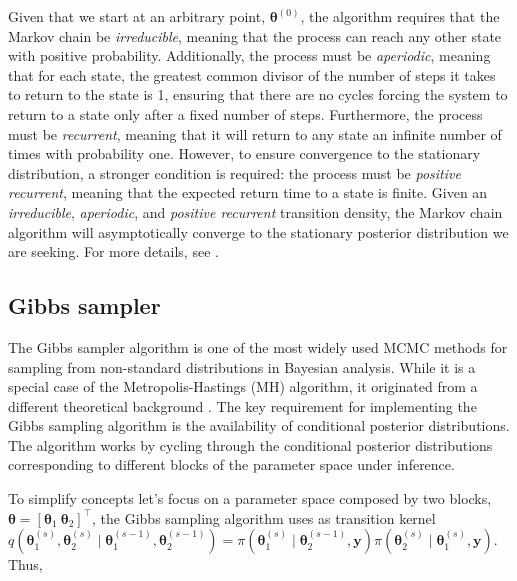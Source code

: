 Given that we start at an arbitrary point, $\bm{\theta}^{(0)}$, the algorithm requires that the Markov chain be \textit{irreducible}, meaning that the process can reach any other state with positive probability. Additionally, the process must be \textit{aperiodic}, meaning that for each state, the greatest common divisor of the number of steps it takes to return to the state is 1, ensuring that there are no cycles forcing the system to return to a state only after a fixed number of steps. Furthermore, the process must be \textit{recurrent}, meaning that it will return to any state an infinite number of times with probability one. However, to ensure convergence to the stationary distribution, a stronger condition is required: the process must be \textit{positive recurrent}, meaning that the expected return time to a state is finite. Given an \textit{irreducible}, \textit{aperiodic}, and \textit{positive recurrent} transition density, the Markov chain algorithm will asymptotically converge to the stationary posterior distribution we are seeking. For more details, see \cite[chap.~6]{robert2011monte}.
   
\subsection{Gibbs sampler}\label{sec511}

The Gibbs sampler algorithm is one of the most widely used MCMC methods for sampling from non-standard distributions in Bayesian analysis. While it is a special case of the Metropolis-Hastings (MH) algorithm, it originated from a different theoretical background \cite{Geman1984,Gelfand1990}. The key requirement for implementing the Gibbs sampling algorithm is the availability of conditional posterior distributions. The algorithm works by cycling through the conditional posterior distributions corresponding to different blocks of the parameter space under inference.

To simplify concepts let's focus on a parameter space composed by two blocks, $\bm{\theta} = [\bm{\theta}_1 \ \bm{\theta}_2]^{\top}$, the Gibbs sampling algorithm uses as transition kernel $q(\bm{\theta}_1^{(s)},\bm{\theta}_2^{(s)}\mid \bm{\theta}_1^{(s-1)},\bm{\theta}_2^{(s-1)})=\pi(\bm{\theta}_1^{(s)}\mid \bm{\theta}_2^{(s-1)},\bm{y})\pi(\bm{\theta}_2^{(s)}\mid \bm{\theta}_1^{(s)},\bm{y})$. Thus,

